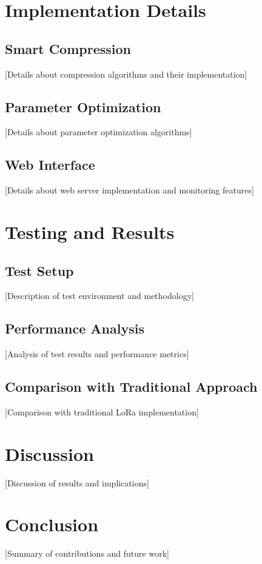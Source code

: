 \documentclass[conference]{IEEEtran}
\begin{document}
\section{Implementation Details}
\subsection{Smart Compression}
[Details about compression algorithms and their implementation]

\subsection{Parameter Optimization}
[Details about parameter optimization algorithms]

\subsection{Web Interface}
[Details about web server implementation and monitoring features]

\section{Testing and Results}
\subsection{Test Setup}
[Description of test environment and methodology]

\subsection{Performance Analysis}
[Analysis of test results and performance metrics]

\subsection{Comparison with Traditional Approach}
[Comparison with traditional LoRa implementation]

\section{Discussion}
[Discussion of results and implications]

\section{Conclusion}
[Summary of contributions and future work]



\end{document}
